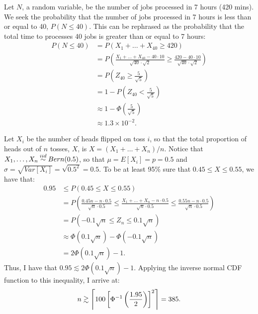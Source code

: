 \begin{problem}{5} Let $N$, a random variable, be the number of jobs processed in 7 hours (420 mins).  We seek the probability that the number of jobs processed in 7 hours is less than or equal to 40, $P(N\le 40)$.  This can be rephrased as the probability that the total time to processes 40 jobs is greater than or equal to 7 hours:
\begin{align*}
P(N\le 40) &= P(X_1+\ldots+X_{40} \ge 420) \\
& = P\left(\frac{X_1+\ldots+X_{40}-40\cdot 10}{\sqrt{40}\cdot \sqrt{2}} \ge \frac{420-40\cdot 10}{\sqrt{40}\cdot \sqrt{2}} \right) \\
& = P\left(Z_{40} \ge \frac{5}{\sqrt{5}}\right) \\
& = 1 - P\left(Z_{40} < \frac{5}{\sqrt{5}}\right) \\
& \approx 1 - \Phi \left(\frac{5}{\sqrt{5}}\right) \\
& \approx 1.3 \times 10^{-2}.
\end{align*}

\end{problem}

\begin{problem}{6} Let $X_i$ be the number of heads flipped on toss $i$, so that the total proportion of heads out of $n$ tosses, $X$, is $X=(X_1+ \ldots +X_n)/n$.  Notice that $X_1, \ldots, X_n \distas{iid}Bern(0.5)$, so that $\mu = E[X_i] = p = 0.5$ and $\sigma = \sqrt{Var[X_i]} = \sqrt{0.5^2} = 0.5$.  To be at least 95\% sure that $0.45\le X \le 0.55$, we have that:
\begin{align*}
0.95 & \le P(0.45 \le X \le 0.55) \\
& = P\left(\frac{0.45n-n\cdot0.5}{\sqrt{n}\cdot 0.5} \le \frac{X_1+\ldots+X_n-n\cdot0.5}{\sqrt{n}\cdot 0.5} \le \frac{0.55n-n\cdot0.5}{\sqrt{n}\cdot 0.5} \right) \\
& = P\left(-0.1 \sqrt{n} \le Z_n \le 0.1 \sqrt{n}  \right) \\
& \approx \Phi (0.1 \sqrt{n}) - \Phi (-0.1 \sqrt{n}) \\
& =2\Phi (0.1 \sqrt{n}) - 1.
\end{align*}
Thus, I have that $0.95 \lesssim 2 \Phi(0.1\sqrt{n})-1$.  Applying the inverse normal CDF function to this inequality, I arrive at:
\begin{equation}
n \gtrsim \ceil*{100\left[ \Phi^{-1} \left ( \frac{1.95}{2} \right)\right]^2} = 385.
\end{equation}

\end{problem}

